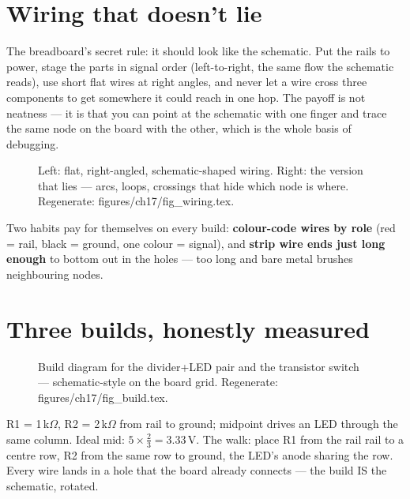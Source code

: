 \section{Wiring that doesn't lie}\label{sec:wiring17}

The breadboard's secret rule: it should look like the schematic.
Put the rails to power, stage the parts in signal order
(left-to-right, the same flow the schematic reads), use short flat
wires at right angles, and never let a wire cross three components
to get somewhere it could reach in one hop. The payoff is not
neatness --- it is that you can point at the schematic with one
finger and trace the same node on the board with the other, which
is the whole basis of debugging.

\begin{figure}[htbp]
\centering

\caption{Left: flat, right-angled, schematic-shaped wiring. Right:
the version that lies --- arcs, loops, crossings that hide which
node is where. Regenerate: \ttfamily figures/ch17/fig\_wiring.tex.}
\label{fig:wiring17}
\end{figure}

\begin{checkpoint}
Two habits pay for themselves on every build: \textbf{colour-code
wires by role} (red = rail, black = ground, one colour = signal), and
\textbf{strip wire ends just long enough} to bottom out in the holes
--- too long and bare metal brushes neighbouring nodes.
\end{checkpoint}

\section{Three builds, honestly measured}\label{sec:builds17}

\begin{figure}[htbp]
\centering

\caption{Build diagram for the divider+LED pair and the transistor
switch --- schematic-style on the board grid. Regenerate: \ttfamily
figures/ch17/fig\_build.tex.}
\label{fig:build17}
\end{figure}

\begin{example}
R1 = 1\,k$\Omega$, R2 = 2\,k$\Omega$ from rail to ground;
midpoint drives an LED through the same column. Ideal mid:
$5\times\frac{2}{3}=3.33$\,V. The walk: place R1 from the rail
rail to a centre row, R2 from the same row to ground, the LED's
anode sharing the row. Every wire lands in a hole that the board
already connects --- the build IS the schematic, rotated.
\end{example}

